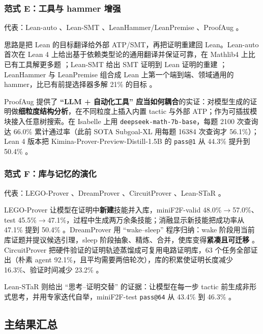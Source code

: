 \documentclass[UTF8,a4paper,11pt,fontset=windows]{ctexart}
\newcommand{\code}[1]{\texttt{#1}}
\begin{document}
\subsubsection{范式 E：工具与 hammer 增强}

代表：Lean-auto \cite{leanauto}、Lean-SMT \cite{leansmt}、LeanHammer/LeanPremise \cite{leanhammer}、ProofAug \cite{proofaug}。

思路是把 Lean 的目标翻译给外部 ATP/SMT，再把证明重建回 Lean。Lean-auto 首次在 Lean 4 上给出基于依赖类型论的通用翻译并保证可靠，在 Mathlib4 上比已有工具解更多题 \cite{leanauto}；Lean-SMT 给出 SMT 证明到 Lean 证明的重建 \cite{leansmt}；LeanHammer 与 LeanPremise 组合成 Lean 上第一个端到端、领域通用的 hammer，比已有前提选择器多解 21\% 的目标 \cite{leanhammer}。

ProofAug 提供了 \textbf{``LLM + 自动化工具'' 应当如何耦合}的实证：对模型生成的证明做\textbf{细粒度结构分析}，在不同粒度上插入内置 tactic 与外部 ATP；作为可插拔模块接入任意树搜索。在 Isabelle 上用 \code{deepseek-math-7b-base}，每题 2100 次查询达 66.0\% 累计通过率（此前 SOTA Subgoal-XL 用每题 16384 次查询才 56.1\%）；Lean 4 版本把 Kimina-Prover-Preview-Distill-1.5B 的 \code{pass@1} 从 44.3\% 提升到 50.4\% \cite{proofaug}。

\subsubsection{范式 F：库与记忆的演化}

代表：LEGO-Prover \cite{lego}、DreamProver \cite{dreamprover}、CircuitProver \cite{circuitprover}、Lean-STaR \cite{leanstar}。

LEGO-Prover 让模型在证明中\textbf{新建}技能并入库，miniF2F-valid 48.0\%$\rightarrow$57.0\%、test 45.5\%$\rightarrow$47.1\%，过程中生成两万余条技能；消融显示新技能把成功率从 47.1\% 提到 50.4\% \cite{lego}。DreamProver 用 ``wake--sleep'' 程序归纳：wake 阶段用当前库证题并提议候选引理，sleep 阶段抽象、精炼、合并，使库变得\textbf{紧凑且可迁移} \cite{dreamprover}。CircuitProver 把硬件验证的证明轨迹蒸馏成可复用电路证明库，63 个任务全部证出（朴素 agent 92.1\%，且平均需要两倍轮次），库的积累使证明长度减少 16.3\%、验证时间减少 23.2\% \cite{circuitprover}。

Lean-STaR 则给出 ``思考--证明交替'' 的证据：让模型在每一步 tactic 前生成非形式思考，并用专家迭代自举，miniF2F-test \code{pass@64} 从 43.4\% 到 46.3\% \cite{leanstar}。

\subsection{主结果汇总}
\end{document}
